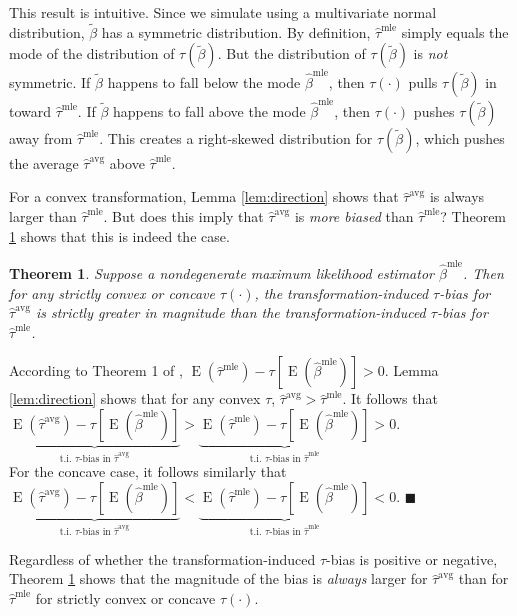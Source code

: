 \documentclass[11pt]{article}
\newtheorem{theorem}{Theorem}
\newenvironment{proof}[1][Proof]{\begin{trivlist}
\item[\hskip \labelsep {\bfseries #1}]}{\end{trivlist}}
\DeclareMathOperator*{\E}{\text{E}}
\begin{document}
\noindent This result is intuitive.
Since we simulate using a multivariate normal distribution, $\tilde{\beta}$ has a symmetric distribution.
By definition, $\hat{\tau}^\text{mle}$ simply equals the mode of the distribution of $\tau(\tilde{\beta})$.
But the distribution of $\tau(\tilde{\beta})$ is \emph{not} symmetric.
If $\tilde{\beta}$ happens to fall below the mode $\hat{\beta}^\text{mle}$, then $\tau(\cdot)$ pulls $\tau(\tilde{\beta})$ in toward $\hat{\tau}^\text{mle}$.
If $\tilde{\beta}$ happens to fall above the mode $\hat{\beta}^\text{mle}$, then $\tau(\cdot)$ pushes $\tau(\tilde{\beta})$ away from $\hat{\tau}^\text{mle}$.
This creates a right-skewed distribution for $\tau(\tilde{\beta})$, which pushes the average $\hat{\tau}^\text{avg}$ above $\hat{\tau}^\text{mle}$.

For a convex transformation, Lemma \ref{lem:direction} shows that $\hat{\tau}^\text{avg}$ is always larger than $\hat{\tau}^\text{mle}$.
But does this imply that $\hat{\tau}^\text{avg}$ is \textit{more biased} than $\hat{\tau}^\text{mle}$? Theorem \ref{thm:direction} shows that this is indeed the case.

\begin{theorem}\label{thm:direction}
Suppose a nondegenerate maximum likelihood estimator $\hat{\beta}^\text{mle}$.
Then for any strictly convex or concave $\tau(\cdot)$, the transformation-induced $\tau$-bias for $\hat{\tau}^{\text{avg}}$ is strictly greater in magnitude than the transformation-induced $\tau$-bias for $\hat{\tau}^{\text{mle}}$.
\end{theorem}
\begin{proof}
According to Theorem 1 of \citet[p. 405]{Rainey2017}, $\E \left( \hat{\tau}^\text{mle}\right) -  \tau \left[\E \left( \hat{\beta}^\text{mle} \right) \right] > 0$.
Lemma \ref{lem:direction} shows that for any convex $\tau$, $\hat{\tau}^{\text{avg}} > \hat{\tau}^\text{mle}$.
It follows that $\underbrace{\E \left( \hat{\tau}^\text{avg}\right) - \tau \left[\E \left( \hat{\beta}^\text{mle} \right) \right]}_{\text{t.i. } \tau\text{-bias in }\hat{\tau}^{\text{avg}}} > \underbrace{\E \left( \hat{\tau}^\text{mle}\right) -  \tau \left[\E \left( \hat{\beta}^\text{mle} \right) \right]}_{\text{t.i. } \tau\text{-bias in }\hat{\tau}^{\text{mle}}} > 0$.\\

\noindent For the concave case, it follows similarly that $\underbrace{\E \left( \hat{\tau}^\text{avg}\right) - \tau \left[\E \left( \hat{\beta}^\text{mle} \right) \right]}_{\text{t.i. } \tau\text{-bias in }\hat{\tau}^{\text{avg}}} < \underbrace{\E \left( \hat{\tau}^\text{mle}\right) -  \tau \left[\E \left( \hat{\beta}^\text{mle} \right) \right]}_{\text{t.i. } \tau\text{-bias in }\hat{\tau}^{\text{mle}}} < 0$.
 $\blacksquare$
\end{proof}
Regardless of whether the transformation-induced $\tau$-bias is positive or negative, Theorem \ref{thm:direction} shows that the magnitude of the bias is \textit{always} larger for $\hat{\tau}^{\text{avg}}$ than for  $\hat{\tau}^{\text{mle}}$ for strictly convex or concave $\tau(\cdot)$.
\end{document}
